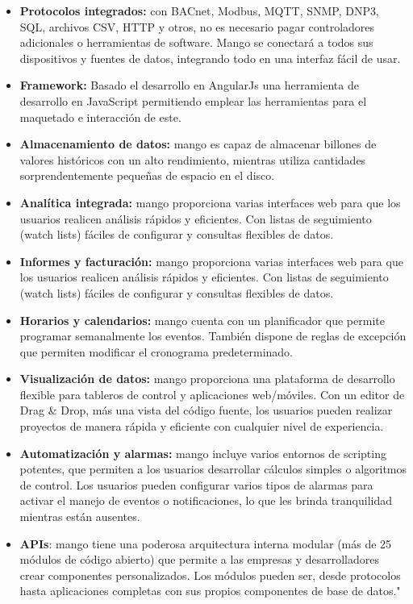 	\begin{itemize}
	    \item \textbf{Protocolos integrados:} con BACnet, Modbus, MQTT, SNMP, DNP3, SQL, archivos CSV, HTTP y otros, no es necesario pagar controladores adicionales o herramientas de software. Mango se conectará a todos sus dispositivos y fuentes de datos, integrando todo en una interfaz fácil de usar.
        
        \item \textbf{Framework:} Basado el desarrollo en AngularJs una herramienta de desarrollo en JavaScript permitiendo emplear las herramientas para el maquetado e interacción de este.

	    \item \textbf{Almacenamiento de datos:} mango es capaz de almacenar billones de valores históricos con un alto rendimiento, mientras utiliza cantidades sorprendentemente pequeñas de espacio en el disco.
	    
	    \item \textbf{Analítica integrada:} mango proporciona varias interfaces web para que los usuarios realicen análisis rápidos y eficientes. Con listas de seguimiento (watch lists) fáciles de configurar y consultas flexibles de datos.
	    
	    \item \textbf{Informes y facturación:} mango proporciona varias interfaces web para que los usuarios realicen análisis rápidos y eficientes. Con listas de seguimiento (watch lists) fáciles de configurar y consultas flexibles de datos.
	    
	    \item \textbf{Horarios y calendarios:} mango cuenta con un planificador que permite programar semanalmente los eventos. También dispone de reglas de excepción que permiten modificar el cronograma predeterminado.
	    
	    \item \textbf{Visualización de datos:}  mango proporciona una plataforma de desarrollo flexible para tableros de control y aplicaciones web/móviles. Con un editor de Drag {\&} Drop, más una vista del código fuente, los usuarios pueden realizar proyectos de manera rápida y eficiente con cualquier nivel de experiencia.
	    
	    \item \textbf{Automatización y alarmas:} mango incluye varios entornos de scripting potentes, que permiten a los usuarios desarrollar cálculos simples o algoritmos de control. Los usuarios pueden configurar varios tipos de alarmas para activar el manejo de eventos o notificaciones, lo que les brinda tranquilidad mientras están ausentes.
	    
	    \item \textbf{APIs}: mango tiene una poderosa arquitectura interna modular (más de 25 módulos de código abierto) que permite a las empresas y desarrolladores crear componentes personalizados. Los módulos pueden ser, desde protocolos hasta aplicaciones completas con sus propios componentes de base de datos."\textcolor{blue}{\cite{MANGO2}}
	    
	\end{itemize}
	
